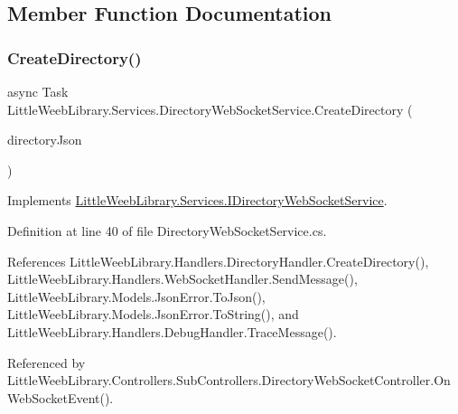 \subsection{Member Function Documentation}
\mbox{\label{class_little_weeb_library_1_1_services_1_1_directory_web_socket_service_a3ea6566e0d21d73d331adce1ae9c7f07}} 
\subsubsection{\texorpdfstring{Create\+Directory()}{CreateDirectory()}}
{\footnotesize\ttfamily async Task Little\+Weeb\+Library.\+Services.\+Directory\+Web\+Socket\+Service.\+Create\+Directory (\begin{DoxyParamCaption}\item[{J\+Object}]{directory\+Json }\end{DoxyParamCaption})}



Implements \mbox{\hyperlink{interface_little_weeb_library_1_1_services_1_1_i_directory_web_socket_service_a8c80286719a0fb39034e2ba88e244bbe}{Little\+Weeb\+Library.\+Services.\+I\+Directory\+Web\+Socket\+Service}}.



Definition at line 40 of file Directory\+Web\+Socket\+Service.\+cs.



References Little\+Weeb\+Library.\+Handlers.\+Directory\+Handler.\+Create\+Directory(), Little\+Weeb\+Library.\+Handlers.\+Web\+Socket\+Handler.\+Send\+Message(), Little\+Weeb\+Library.\+Models.\+Json\+Error.\+To\+Json(), Little\+Weeb\+Library.\+Models.\+Json\+Error.\+To\+String(), and Little\+Weeb\+Library.\+Handlers.\+Debug\+Handler.\+Trace\+Message().



Referenced by Little\+Weeb\+Library.\+Controllers.\+Sub\+Controllers.\+Directory\+Web\+Socket\+Controller.\+On\+Web\+Socket\+Event().


